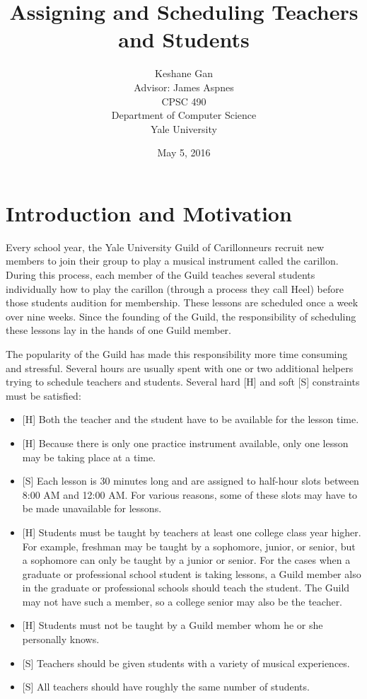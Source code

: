 \documentclass[letterpaper]{article}
\author{Keshane Gan\\
        Advisor: James Aspnes\\
        CPSC 490\\
        Department of Computer Science\\
        Yale University}
\date{May 5, 2016}
\title{Assigning and Scheduling Teachers and Students}
\begin{document}
\maketitle
\section{Introduction and Motivation}
Every school year, the Yale University Guild of Carillonneurs recruit new members to join their group to play a musical
instrument called the carillon. During this process, each member of the Guild teaches several students individually how to play the
carillon (through a process they call Heel) before those students audition for membership. These lessons are scheduled
once a week over nine weeks. Since the founding of the Guild, the responsibility of scheduling these lessons lay in the
hands of one Guild member. 

The popularity of the Guild has made this responsibility more time consuming and stressful. Several hours are usually
spent with one or two additional helpers trying to schedule teachers and students. Several hard [H] and soft [S] constraints
must be satisfied:
\begin{itemize}
    \item {[H]} Both the teacher and the student have to be available for the lesson time.
    \item {[H]} Because there is only one practice instrument available, only one lesson may be taking place at a time.
    \item {[S]} Each lesson is 30 minutes long and are assigned to half-hour slots between 8:00 AM and 12:00 AM. For various
        reasons, some of these slots may have to be made unavailable for lessons.
    \item {[H]} Students must be taught by teachers at least one college class year higher. For example, freshman may be
        taught by a sophomore, junior, or senior, but a sophomore can only be taught by a junior or senior. For the
        cases when a graduate or professional school student is taking lessons, a Guild member also in the graduate or
        professional schools should teach the student. The Guild may not have such a member, so a college senior may
        also be the teacher.
    \item {[H]} Students must not be taught by a Guild member whom he or she personally knows.
    \item {[S]} Teachers should be given students with a variety of musical experiences.
    \item {[S]} All teachers should have roughly the same number of students.
\end{itemize}
\end{document}
